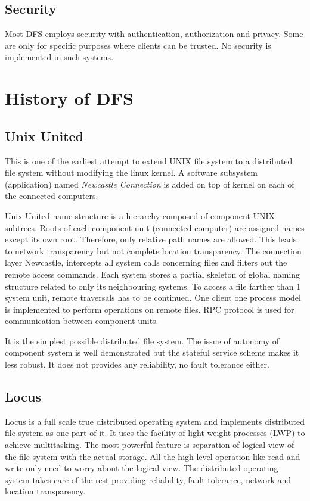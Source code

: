 \documentclass[a4paper,12pt]{article}
\begin{document}
\subsection{Security}
Most DFS employs security with authentication, authorization and privacy. Some are only for specific purposes where clients can be trusted. No security is implemented in such systems.

\section{History of DFS}
\label{sec:history}
\subsection{Unix United \cite[p.~342]{old_dfs}}
\label{sec:unix_united}
This is one of the earliest attempt to extend UNIX file system to a distributed file system without modifying the linux kernel. A software subsystem (application) named \textit{Newcastle Connection} is added on top of kernel on each of the connected computers. 

Unix United name structure is a hierarchy composed of component UNIX subtrees. Roots of each component unit (connected computer) are assigned names except its own root. Therefore, only relative path names are allowed. This leads to network transparency but not complete location transparency. The connection layer Newcastle, intercepts all system calls concerning files and filters out the remote access commands. Each system stores a partial skeleton of global naming structure related to only its neighbouring systems. To access a file farther than 1 system unit, remote traversals has to be continued.  One client one process model is implemented to perform operations on remote files. RPC protocol is used for communication between component units. 

It is the simplest possible distributed file system. The issue of autonomy of component system is well demonstrated but the stateful service scheme makes it less robust. It does not provides any reliability, no fault tolerance either.

\subsection{Locus \cite[p.~345]{old_dfs}}
\label{sec:locus}
Locus is a full scale true distributed operating system and implements distributed file system as one part of it. It uses the facility of light weight processes (LWP) to achieve multitasking. The most powerful feature is separation of logical view of the file system with the actual storage. All the high level operation like read and write only need to worry about the logical view. The distributed operating system takes care of the rest providing reliability, fault tolerance, network and location transparency.
\end{document}
